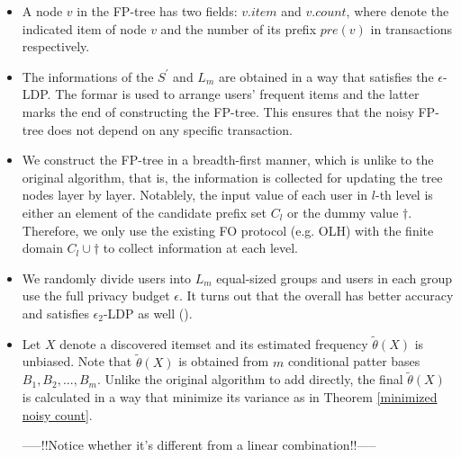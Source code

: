 \documentclass[conference]{IEEEtran}
\begin{document}
\begin{itemize}
\item A node $v$ in the FP-tree has two fields: $v.item$ and $v.count$, where denote the indicated item of node $v$ and the number of its prefix $pre(v)$ in transactions respectively.
\item The informations of the $S^{\prime}$ and $L_m$ are obtained in a way that satisfies the $\epsilon$-LDP. The formar is used to arrange users' frequent items and the latter marks the end of constructing the FP-tree. This ensures that the noisy FP-tree does not depend on any specific transaction.
\item We construct the FP-tree in a breadth-first manner, which is unlike to the original algorithm, that is, the information is collected for updating the tree nodes layer by layer. Notablely, the input value of each user in $l$-th level is either an element of the candidate prefix set $C_l$ or the dummy value $\dagger$. Therefore, we only use the existing FO protocol (e.g. OLH) with the finite domain $C_l \cup \dagger$ to collect information at each level.
\item We randomly divide users into $L_m$ equal-sized groups and users in each group use the full privacy budget $\epsilon$. It turns out that the overall has better accuracy and satisfies $\epsilon_2$-LDP as well (\cite{a8,privtrie}).
\item {\color{red} Let $X$ denote a discovered itemset and its estimated frequency $\tilde {\theta}(X)$ is unbiased. Note that $\tilde {\theta}(X)$ is obtained from $m$ conditional patter bases $B_1,B_2,...,B_m$. Unlike the original algorithm to add directly, the final $\tilde {\theta}(X)$ is calculated in a way that minimize its variance as in Theorem \ref{minimized noisy count}. 






-----!!Notice whether it's different from a linear combination!!-----}

\end{itemize}
\end{document}
